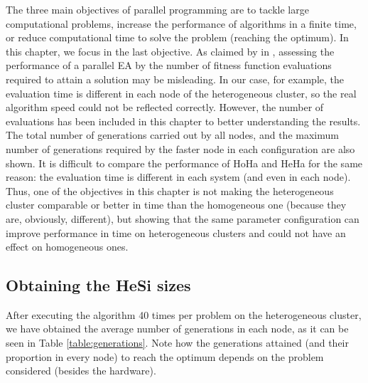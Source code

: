 The three main objectives of parallel programming are to tackle large
computational problems, increase the performance of algorithms in a
finite time, or reduce computational time to solve the problem
(reaching the optimum). In this chapter, we focus in the last
objective. %
As claimed by  in
\cite{Alba06evaluationParallel}, assessing the performance of a
parallel EA by the number of fitness function evaluations required to
attain a solution may be misleading. In our case, for example, the
evaluation time is different in each node of the heterogeneous
cluster, so the real algorithm speed could not be reflected
correctly. %
 However, the number of evaluations has been included in
this chapter to better understanding the results. %
The total number of
generations carried out by all nodes, and the maximum number of
generations required by the faster node in each configuration are also
shown. It is difficult to compare the performance of HoHa and HeHa for
the same reason: the evaluation time is different in each system (and
even in each node). Thus, one of the objectives in this chapter is not
making the heterogeneous cluster comparable or better in time than the
homogeneous one (because they are, obviously, different), but showing
that the same parameter configuration can improve performance in time
on heterogeneous clusters and could not have an effect on homogeneous
ones. 

\subsection{Obtaining the HeSi sizes}
\label{subsec:adaptive:hesisizes}
After executing the algorithm 40 times per problem on the
heterogeneous cluster, %
we have obtained the average number of generations in each node, as it
can be seen in Table \ref{table:generations}. Note how the generations
attained (and their proportion in every node) to reach the optimum
depends on the problem considered (besides the hardware). %

